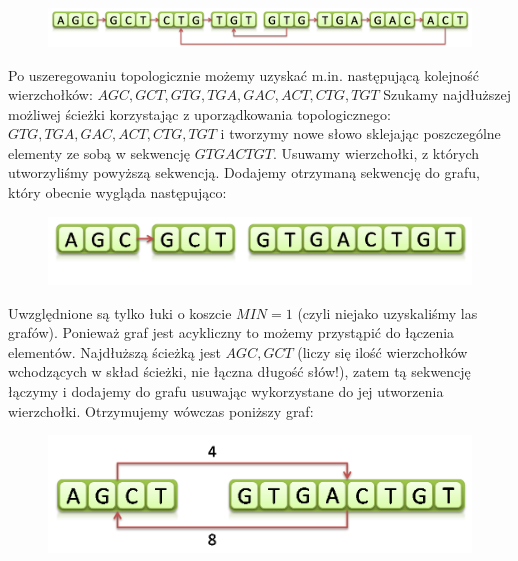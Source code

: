 \documentclass[a4paper,10pt]{article}
\begin{document}
\begin{figure}[h]
  \footnotesize\centering
  \includegraphics[width=\textwidth,keepaspectratio]{Graph2.png}
\end{figure}

Po uszeregowaniu topologicznie możemy uzyskać m.in. następującą kolejność wierzchołków:
$AGC, GCT, GTG, TGA, GAC, ACT, CTG, TGT$
Szukamy najdłuższej możliwej ścieżki korzystając z uporządkowania topologicznego: \linebreak
$GTG, TGA, GAC, ACT, CTG, TGT$
i tworzymy nowe słowo sklejając poszczególne elementy ze sobą w sekwencję $GTGACTGT$.
Usuwamy wierzchołki, z których utworzyliśmy powyższą sekwencją. Dodajemy otrzymaną sekwencję do grafu, który obecnie wygląda następująco:

\begin{figure}[h]
  \footnotesize\centering
  \includegraphics[width=\textwidth,keepaspectratio]{Graph3.png}
\end{figure}

Uwzględnione są tylko łuki o koszcie $MIN=1$ (czyli niejako uzyskaliśmy las grafów). 
Ponieważ graf jest acykliczny to możemy przystąpić do łączenia elementów. 
Najdłuższą ścieżką jest $AGC, GCT$ (liczy się ilość wierzchołków wchodzących w skład ścieżki, nie łączna długość słów!), 
zatem tą sekwencję łączymy i dodajemy do grafu usuwając wykorzystane do jej utworzenia wierzchołki.
Otrzymujemy wówczas poniższy graf:

\begin{figure}[h]
  \footnotesize\centering
  \includegraphics[width=\textwidth,keepaspectratio]{Graph4.png}
\end{figure}
		 
\end{document}
